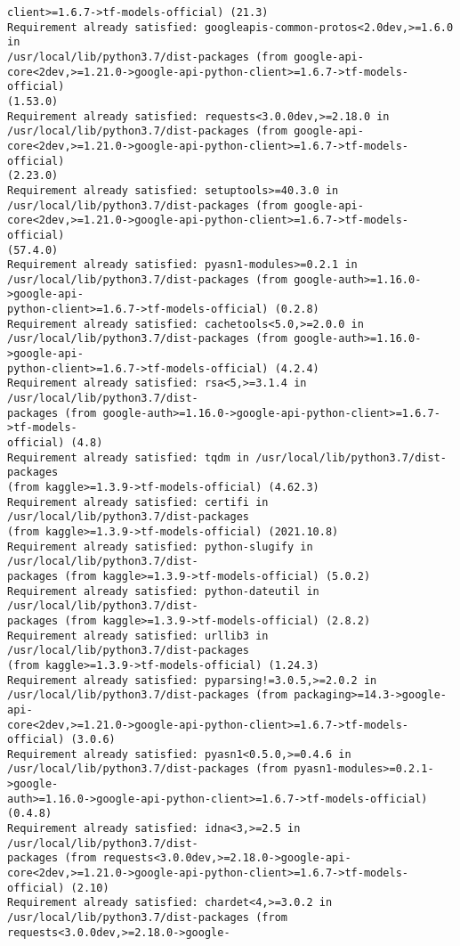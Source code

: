 \documentclass[11pt]{article}
\begin{document}
\begin{Verbatim}[commandchars=\\\{\}]
client>=1.6.7->tf-models-official) (21.3)
Requirement already satisfied: googleapis-common-protos<2.0dev,>=1.6.0 in
/usr/local/lib/python3.7/dist-packages (from google-api-
core<2dev,>=1.21.0->google-api-python-client>=1.6.7->tf-models-official)
(1.53.0)
Requirement already satisfied: requests<3.0.0dev,>=2.18.0 in
/usr/local/lib/python3.7/dist-packages (from google-api-
core<2dev,>=1.21.0->google-api-python-client>=1.6.7->tf-models-official)
(2.23.0)
Requirement already satisfied: setuptools>=40.3.0 in
/usr/local/lib/python3.7/dist-packages (from google-api-
core<2dev,>=1.21.0->google-api-python-client>=1.6.7->tf-models-official)
(57.4.0)
Requirement already satisfied: pyasn1-modules>=0.2.1 in
/usr/local/lib/python3.7/dist-packages (from google-auth>=1.16.0->google-api-
python-client>=1.6.7->tf-models-official) (0.2.8)
Requirement already satisfied: cachetools<5.0,>=2.0.0 in
/usr/local/lib/python3.7/dist-packages (from google-auth>=1.16.0->google-api-
python-client>=1.6.7->tf-models-official) (4.2.4)
Requirement already satisfied: rsa<5,>=3.1.4 in /usr/local/lib/python3.7/dist-
packages (from google-auth>=1.16.0->google-api-python-client>=1.6.7->tf-models-
official) (4.8)
Requirement already satisfied: tqdm in /usr/local/lib/python3.7/dist-packages
(from kaggle>=1.3.9->tf-models-official) (4.62.3)
Requirement already satisfied: certifi in /usr/local/lib/python3.7/dist-packages
(from kaggle>=1.3.9->tf-models-official) (2021.10.8)
Requirement already satisfied: python-slugify in /usr/local/lib/python3.7/dist-
packages (from kaggle>=1.3.9->tf-models-official) (5.0.2)
Requirement already satisfied: python-dateutil in /usr/local/lib/python3.7/dist-
packages (from kaggle>=1.3.9->tf-models-official) (2.8.2)
Requirement already satisfied: urllib3 in /usr/local/lib/python3.7/dist-packages
(from kaggle>=1.3.9->tf-models-official) (1.24.3)
Requirement already satisfied: pyparsing!=3.0.5,>=2.0.2 in
/usr/local/lib/python3.7/dist-packages (from packaging>=14.3->google-api-
core<2dev,>=1.21.0->google-api-python-client>=1.6.7->tf-models-official) (3.0.6)
Requirement already satisfied: pyasn1<0.5.0,>=0.4.6 in
/usr/local/lib/python3.7/dist-packages (from pyasn1-modules>=0.2.1->google-
auth>=1.16.0->google-api-python-client>=1.6.7->tf-models-official) (0.4.8)
Requirement already satisfied: idna<3,>=2.5 in /usr/local/lib/python3.7/dist-
packages (from requests<3.0.0dev,>=2.18.0->google-api-
core<2dev,>=1.21.0->google-api-python-client>=1.6.7->tf-models-official) (2.10)
Requirement already satisfied: chardet<4,>=3.0.2 in
/usr/local/lib/python3.7/dist-packages (from requests<3.0.0dev,>=2.18.0->google-

\end{Verbatim}
\end{document}
